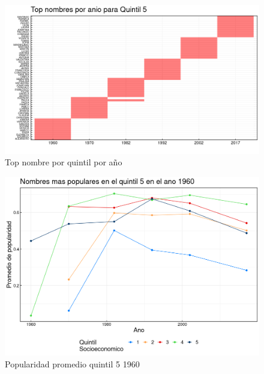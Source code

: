\begin{landscape}
\begin{figure}[H]
\begin{center}
    \includegraphics[width=22cm]{plot/top_quintil_5.png}
    \caption{Top nombre por quintil por año}
    \label{fig:top_quintil_5}
\end{center}
\end{figure}
\end{landscape}

\begin{landscape}
\begin{figure}[H]
    \centering
    \includegraphics[width=18cm]{plot/popularidad_1960.png}
    \caption{Popularidad promedio quintil 5 1960}
    \label{fig:popularidad_1960}
\end{figure}
\end{landscape}

